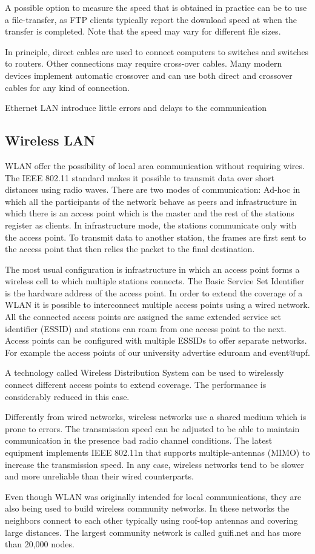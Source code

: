 A possible option to measure the speed that is obtained in practice can be to use a file-transfer, as FTP clients typically report the download speed at when the transfer is completed.
Note that the speed may vary for different file sizes.

In principle, direct cables are used to connect computers to switches and switches to routers.
Other connections may require cross-over cables.
Many modern devices implement automatic crossover and can use both direct and crossover cables for any kind of connection.

Ethernet LAN introduce little errors and delays to the communication

\subsection{Wireless LAN}

WLAN offer the possibility of local area communication without requiring wires.
The IEEE 802.11 standard makes it possible to transmit data over short distances using radio waves.
There are two modes of communication: Ad-hoc in which all the participants of the network behave as peers and infrastructure in which there is an access point which is the master and the rest of the stations register as clients.
In infrastructure mode, the stations communicate only with the access point.
To transmit data to another station, the frames are first sent to the access point that then relies the packet to the final destination.

The most usual configuration is infrastructure in which an access point forms a wireless cell to which multiple stations connects.
The Basic Service Set Identifier is the hardware address of the access point.
In order to extend the coverage of a WLAN it is possible to interconnect multiple access points using a wired network.
All the connected access points are assigned the same extended service set identifier (ESSID) and stations can roam from one access point to the next.
Access points can be configured with multiple ESSIDs to offer separate networks.
For example the access points of our university advertise eduroam and event@upf.

A technology called Wireless Distribution System can be used to wirelessly connect different access points to extend coverage.
The performance is considerably reduced in this case.

Differently from wired networks, wireless networks use a shared medium which is prone to errors.
The transmission speed can be adjusted to be able to maintain communication in the presence bad radio channel conditions.
The latest equipment implements IEEE 802.11n that supports multiple-antennas (MIMO) to increase the transmission speed.
In any case, wireless networks tend to be slower and more unreliable than their wired counterparts.

Even though WLAN was originally intended for local communications, they are also being used to build wireless community networks.
In these networks the neighbors connect to each other typically using roof-top antennas and covering large distances.
The largest community network is called guifi.net and has more than 20,000 nodes.

